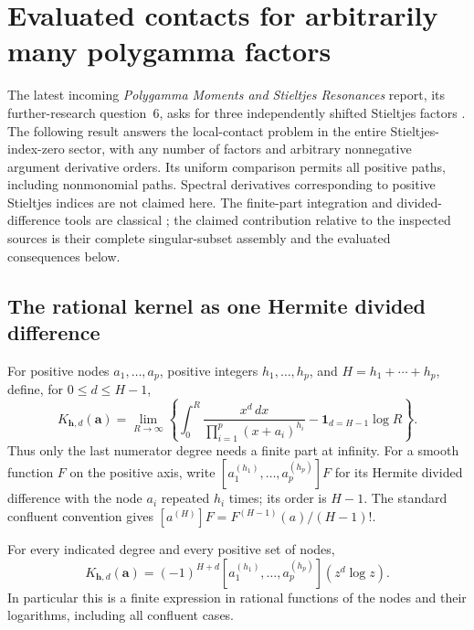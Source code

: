 
\section{Evaluated contacts for arbitrarily many polygamma factors}
\label{pc:section}

The latest incoming \emph{Polygamma Moments and Stieltjes Resonances}
report, its further-research question~6, asks for three independently shifted
Stieltjes factors \cite{PolygammaResonances}.  The following result answers the local-contact problem in the entire
Stieltjes-index-zero sector, with any number of factors and arbitrary
nonnegative argument derivative orders.  Its uniform comparison permits
all positive paths, including nonmonomial paths.  Spectral derivatives
corresponding to positive Stieltjes indices are not claimed here.
The finite-part integration and divided-difference tools are classical
\cite{DeBoor,TicaGalapon,VillanuevaGalapon};
the claimed contribution relative to the inspected sources is their
complete singular-subset assembly and the evaluated consequences below.

\subsection{The rational kernel as one Hermite divided difference}

For positive nodes $a_1,\ldots,a_p$, positive integers
$h_1,\ldots,h_p$, and $H=h_1+\cdots+h_p$, define, for
$0\le d\le H-1$,
\begin{equation}\label{pc:kernel-def}
 K_{\boldsymbol h,d}(\boldsymbol a)
 =\lim_{R\to\infty}\left\{
       \int_0^R\frac{x^d\,dx}{\prod_{i=1}^p(x+a_i)^{h_i}}
                 -\mathbf1_{d=H-1}\log R\right\}.
\end{equation}
Thus only the last numerator degree needs a finite part at infinity.
For a smooth function $F$ on the positive axis, write
$[a_1^{(h_1)},\ldots,a_p^{(h_p)}]F$ for its Hermite divided
difference with the node $a_i$ repeated $h_i$ times; its order is $H-1$.
The standard confluent convention \cite{DeBoor} gives
$[a^{(H)}]F=F^{(H-1)}(a)/(H-1)!$.

\begin{lemma}\label{pc:kernel}
For every indicated degree and every positive set of nodes,
\begin{equation}\label{pc:kernel-dd}
 \boxed{\displaystyle
 K_{\boldsymbol h,d}(\boldsymbol a)
     =(-1)^{H+d}
       [a_1^{(h_1)},\ldots,a_p^{(h_p)}](z^d\log z).}
\end{equation}
In particular this is a finite expression in rational functions of the
nodes and their logarithms, including all confluent cases.
\end{lemma}

